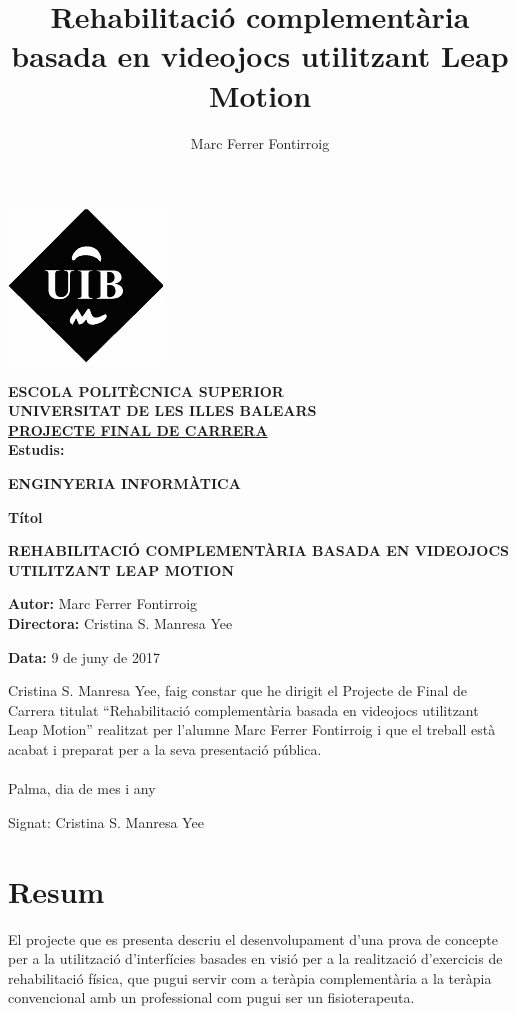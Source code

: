 \documentclass[12pt,a4paper,catalan]{article}
\author{Marc Ferrer Fontirroig}
\title{Rehabilitació complementària basada en videojocs utilitzant Leap Motion}
\begin{document}
	\thispagestyle{empty}
	\begin{center}
		\includegraphics[scale=0.7]{uib-logo.jpg}
	\end{center}
	\begin{center}
		\textbf{ESCOLA POLITÈCNICA SUPERIOR}\\
		\textbf{UNIVERSITAT DE LES ILLES BALEARS}\\
		\vspace{3em}
		\textbf{\underline{\Large{PROJECTE FINAL DE CARRERA}}}\\
		\vspace{1.5em}
		\textbf{\large{Estudis:}}
		\begin{framed}
			\textbf{\large{ENGINYERIA INFORMÀTICA}}
		\end{framed}
		\textbf{\large{Títol}}
		\begin{framed}
			\textbf{REHABILITACIÓ COMPLEMENTÀRIA BASADA EN VIDEOJOCS UTILITZANT LEAP MOTION}
		\end{framed}
		\vspace{3em}
	\end{center}
	\begin{flushright}
		\textbf{Autor:} Marc Ferrer Fontirroig\\
		\textbf{Directora:} Cristina S. Manresa Yee\\
	\end{flushright}
	\textbf{Data:} 9 de juny de 2017
	\newpage
	\tableofcontents
	\newpage
	\listoffigures
	\newpage
	\noindent Cristina S. Manresa Yee, faig constar que he dirigit el Projecte de Final de Carrera titulat “Rehabilitació complementària basada en videojocs utilitzant Leap Motion” realitzat per l'alumne Marc Ferrer Fontirroig i que el treball està acabat i preparat per a la seva presentació pública.\\\\
	Palma,  dia de mes i any
	
	\vspace{3cm}
	
	\noindent Signat: Cristina S. Manresa Yee
	\newpage
	\section*{Resum}
	El projecte que es presenta descriu el desenvolupament d'una prova de concepte per a la utilització d'interfícies basades en visió per a la realització d'exercicis de rehabilitació física, que pugui servir com a teràpia complementària a la teràpia convencional amb un professional com pugui ser un fisioterapeuta.
	
\end{document}

